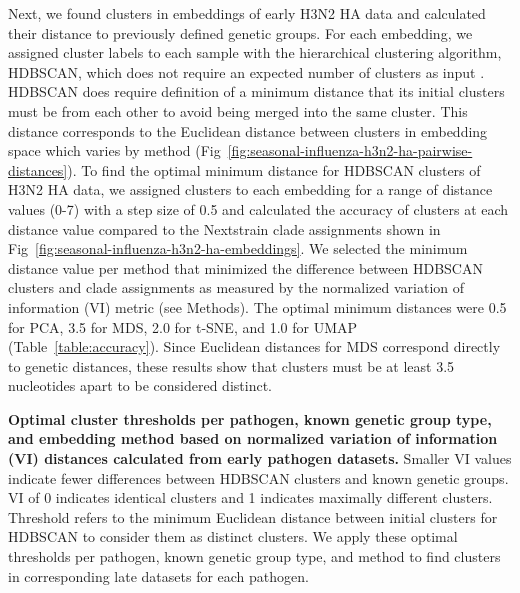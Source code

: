 \documentclass[10pt,letterpaper]{article}
\begin{document}
Next, we found clusters in embeddings of early H3N2 HA data and calculated their distance to previously defined genetic groups.
For each embedding, we assigned cluster labels to each sample with the hierarchical clustering algorithm, HDBSCAN, which does not require an expected number of clusters as input \cite{campello2015hierarchical}.
HDBSCAN does require definition of a minimum distance that its initial clusters must be from each other to avoid being merged into the same cluster.
This distance corresponds to the Euclidean distance between clusters in embedding space which varies by method (Fig~\ref{fig:seasonal-influenza-h3n2-ha-pairwise-distances}).
To find the optimal minimum distance for HDBSCAN clusters of H3N2 HA data, we assigned clusters to each embedding for a range of distance values (0-7) with a step size of 0.5 and calculated the accuracy of clusters at each distance value compared to the Nextstrain clade assignments shown in Fig~\ref{fig:seasonal-influenza-h3n2-ha-embeddings}.
We selected the minimum distance value per method that minimized the difference between HDBSCAN clusters and clade assignments as measured by the normalized variation of information (VI) metric \cite{meilua2003comparing} (see Methods).
The optimal minimum distances were 0.5 for PCA, 3.5 for MDS, 2.0 for t-SNE, and 1.0 for UMAP (Table~\ref{table:accuracy}).
Since Euclidean distances for MDS correspond directly to genetic distances, these results show that clusters must be at least 3.5 nucleotides apart to be considered distinct.

\begin{table}[!ht]
\centering
\caption{
  {\bf Optimal cluster thresholds per pathogen, known genetic group type, and embedding method based on normalized variation of information (VI) distances calculated from early pathogen datasets.}
  Smaller VI values indicate fewer differences between HDBSCAN clusters and known genetic groups.
  VI of 0 indicates identical clusters and 1 indicates maximally different clusters.
  Threshold refers to the minimum Euclidean distance between initial clusters for HDBSCAN to consider them as distinct clusters.
  We apply these optimal thresholds per pathogen, known genetic group type, and method to find clusters in corresponding late datasets for each pathogen.}

\label{table:accuracy}
\end{table}
\end{document}
